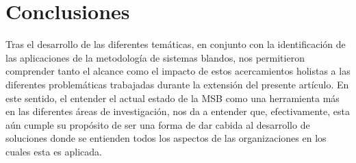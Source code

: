 \documentclass[10pt,letterpaper,twoside,twocolumn]{article}   %
\begin{document}
\section{Conclusiones}
Tras el desarrollo de las diferentes temáticas, en conjunto con la identificación de las aplicaciones de la metodología de sistemas blandos, nos permitieron comprender tanto el alcance como el impacto de estos acercamientos holistas a las diferentes problemáticas trabajadas durante la extensión del presente artículo. En este sentido, el entender el actual estado de la MSB como una herramienta más en las diferentes áreas de investigación, nos da a entender que, efectivamente, esta aún cumple su propósito de ser una forma de dar cabida al desarrollo de soluciones donde se entienden todos los aspectos de las organizaciones en los cuales esta es aplicada.



\end{document}
